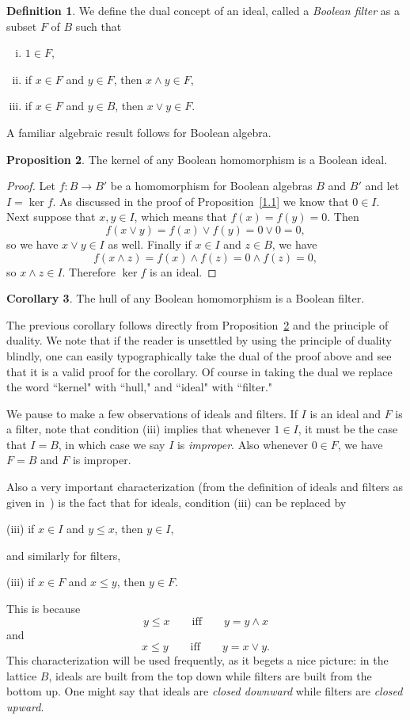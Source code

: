 \documentclass[11pt,titlepage]{article}
\newcommand{\spifff}{\qquad\text{iff}\qquad}
\theoremstyle{definition}
\newtheorem{definition}{Definition}[subsection]
\newtheorem{corollary}[definition]{Corollary}
\newtheorem{proposition}[definition]{Proposition}
\begin{document}
\begin{definition} We define the dual concept of an ideal, called a {\em Boolean filter} as a subset $F$ of $B$ such that \begin{enumerate}[(i)]
\item{$1\in F$,}
\item{if $x\in F$ and $y\in F$, then $x\land y\in F$,}
\item{if $x\in F$ and $y\in B$, then $x\lor y\in F$.}
\end{enumerate}
\end{definition}

A familiar algebraic result follows for Boolean algebra.

\begin{proposition}\label{k=I} The kernel of any Boolean homomorphism is a Boolean ideal.\end{proposition}
\begin{proof} Let $f:B\to B'$ be a homomorphism for Boolean algebras $B$ and $B'$ and let $I=\ker f$. As discussed in the proof of Proposition~\ref{1.1} we know that $0\in I$. Next suppose that $x, y \in I$, which means that $f(x)=f(y)=0$. Then $$f(x\lor y)=f(x)\lor f(y) = 0\lor 0 = 0,$$ so we have $x\lor y\in I$ as well. Finally if $x\in I$ and $z\in B$, we have $$f(x\land z)=f(x)\land f(z)=0\land f(z)=0,$$ so $x\land z\in I$. Therefore $\ker f$ is an ideal. \end{proof}

\begin{corollary} \label{hull} The hull of any Boolean homomorphism is a Boolean filter.\end{corollary}
The previous corollary follows directly from Proposition~\ref{k=I} and the principle of duality. We note that if the reader is unsettled by using the principle of duality blindly, one can easily typographically take the dual of the proof above and see that it is a valid proof for the corollary. Of course in taking the dual we replace the word ``kernel" with ``hull," and ``ideal" with ``filter."

We pause to make a few observations of ideals and filters. If $I$ is an ideal and $F$ is a filter, note that condition (iii) implies that whenever $1\in I$, it must be the case that $I=B$, in which case we say $I$ is {\em improper}. Also whenever $0\in F$, we have $F=B$ and $F$ is improper.

Also a very important characterization (from the definition of ideals and filters as given in~\cite{Bell}) is the fact that for ideals, condition (iii) can be replaced by \begin{center}(iii) if $x\in I$ and $y\leq x$, then $y\in I$,\end{center} and similarly for filters, 
\begin{center}(iii) if $x\in F$ and $x\leq y$, then $y\in F$.\end{center} This is because $$y\leq x\spifff y=y\land x$$ and $$x\leq y \spifff y = x\lor y.$$ This characterization will be used frequently, as it begets a nice picture: in the lattice $B$, ideals are built from the top down while filters are built from the bottom up. One might say that ideals are {\em closed downward} while filters are {\em closed upward}.
\end{document}
